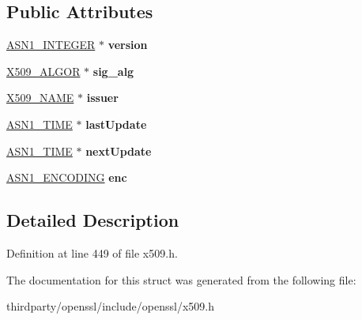 \subsection*{Public Attributes}
\begin{DoxyCompactItemize}
\item 
\mbox{\label{struct_x509__crl__info__st_a12cb6a18829a8d4deee72ead8ff4c4e9}} 
\hyperlink{structasn1__string__st}{A\+S\+N1\+\_\+\+I\+N\+T\+E\+G\+ER} $\ast$ {\bfseries version}
\item 
\mbox{\label{struct_x509__crl__info__st_a9f9d7f31d09d6f5dfd60866725a6d137}} 
\hyperlink{struct_x509__algor__st}{X509\+\_\+\+A\+L\+G\+OR} $\ast$ {\bfseries sig\+\_\+alg}
\item 
\mbox{\label{struct_x509__crl__info__st_aae3a87ee2ba5f6fb7dce53ad9c5fd41f}} 
\hyperlink{struct_x509__name__st}{X509\+\_\+\+N\+A\+ME} $\ast$ {\bfseries issuer}
\item 
\mbox{\label{struct_x509__crl__info__st_a08aec2ca3fe248541ad5fabbc5cb4762}} 
\hyperlink{structasn1__string__st}{A\+S\+N1\+\_\+\+T\+I\+ME} $\ast$ {\bfseries last\+Update}
\item 
\mbox{\label{struct_x509__crl__info__st_ac6c7bfd0eb7eb97b75a65ad68ebbea86}} 
\hyperlink{structasn1__string__st}{A\+S\+N1\+\_\+\+T\+I\+ME} $\ast$ {\bfseries next\+Update}
\item 
\mbox{\label{struct_x509__crl__info__st_a71a2decf2c34f6f0bbb91dbe42479784}} 
\hyperlink{struct_a_s_n1___e_n_c_o_d_i_n_g__st}{A\+S\+N1\+\_\+\+E\+N\+C\+O\+D\+I\+NG} {\bfseries enc}
\end{DoxyCompactItemize}


\subsection{Detailed Description}


Definition at line 449 of file x509.\+h.



The documentation for this struct was generated from the following file\+:\begin{DoxyCompactItemize}
\item 
thirdparty/openssl/include/openssl/x509.\+h\end{DoxyCompactItemize}
